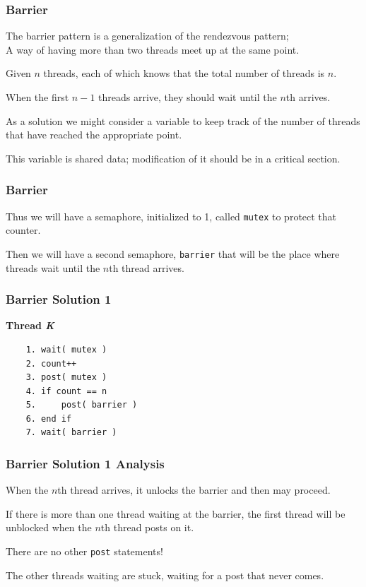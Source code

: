 \begin{frame}
\frametitle{Barrier}

The barrier pattern is a generalization of the rendezvous pattern;\\
\quad A way of having more than two threads meet up at the same point. 

Given $n$ threads, each of which knows that the total number of threads is $n$.

When the first $n-1$ threads arrive, they should wait until the $n$th arrives. 

As a solution we might consider a variable to keep track of the number of threads that have reached the appropriate point. 

This variable is shared data; modification of it should be in a critical section.


\end{frame}

\begin{frame}
\frametitle{Barrier}

Thus we will have a semaphore, initialized to 1, called \texttt{mutex} to protect that counter.

 Then we will have a second semaphore, \texttt{barrier} that will be the place where threads wait until the $n$th thread arrives.


\end{frame}

\begin{frame}[fragile]
\frametitle{Barrier Solution 1}

\textbf{Thread \textit{K}}\vspace{-10em}
  \begin{verbatim}
	1. wait( mutex )
	2. count++
	3. post( mutex )
	4. if count == n
	5.     post( barrier )
	6. end if
	7. wait( barrier )
  \end{verbatim}
\vspace{-2em}


\end{frame}

\begin{frame}
\frametitle{Barrier Solution 1 Analysis}

When the $n$th thread arrives, it unlocks the barrier and then may proceed. 

If there is more than one thread waiting at the barrier, the first thread will be unblocked when the $n$th thread posts on it.

There are no other \texttt{post} statements!

The other threads waiting are stuck, waiting for a post that never comes.


\end{frame}


